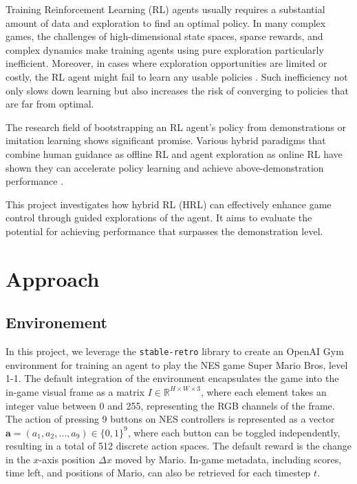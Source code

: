 \documentclass{article}
\begin{document}

Training Reinforcement Learning (RL) agents usually requires a substantial 
amount of data and exploration to find an optimal policy. In many complex 
games, the challenges of high-dimensional state spaces, sparse rewards, and 
complex dynamics make training agents using pure exploration particularly 
inefficient. Moreover, in cases where exploration opportunities are limited or 
costly, the RL agent might fail to learn any usable policies \cite{Coletti2023EffectivenessOW}. 
Such inefficiency not only slows down learning but also increases the risk of 
converging to policies that are far from optimal.

The research field of bootstrapping an RL agent's policy from demonstrations or 
imitation learning shows significant promise. Various hybrid paradigms that 
combine human guidance as offline RL and agent exploration as online RL have 
shown they can accelerate policy learning and achieve above-demonstration 
performance \cite{hester_dqfd_2017,nair_bcrl_overcoming_2018, song_hybrid_2023, 
ren_hybrid_2024, Coletti2023EffectivenessOW}.

This project investigates how hybrid RL (HRL) can effectively enhance game control 
through guided explorations of the agent. It aims to evaluate the potential for 
achieving performance that surpasses the demonstration level.

\section{Approach}
\subsection{Environement}
In this project, we leverage the \texttt{stable-retro} library to create an OpenAI Gym 
environment for training an agent to play the NES game Super Mario Bros, level 1-1. The 
default integration of the environment encapsulates the game into the in-game visual 
frame as a matrix $I \in \mathbb{R}^{H \times W \times 3}$, where each element takes an 
integer value between 0 and 255, representing the RGB channels of the frame. The action 
of pressing 9 buttons on NES controllers is represented as a vector 
$\mathbf{a} = (a_1, a_2, \dots, a_9) \in \{0, 1\}^9$, where each button can be toggled 
independently, resulting in a total of 512 discrete action spaces. The default reward 
is the change in the $x$-axis position $\Delta x$ moved by Mario. In-game metadata, including 
scores, time left, and positions of Mario, can also be retrieved for each timestep $t$.
\end{document}
